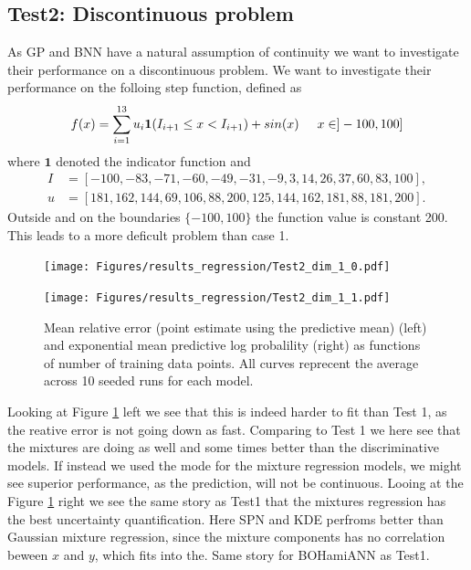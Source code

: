 \subsection*{Test2: Discontinuous problem}
As GP and BNN have a natural assumption of continuity we want to investigate their performance
on a discontinuous problem. We want to investigate their performance on the folloing step function, 
defined as 
$$f(x) = \sum_{i=1}^{13} u_i \bm{1}(I_{i+1}\leq x< I_{i+1}) + sin(x) \hspace{0.5cm} x \in ]-100,100]$$
where $\bm{1}$ denoted the indicator function and
\begin{align*}
  I &= [-100,  -83,  -71,  -60,  -49,  -31,   -9,    3,   14,26,   37,   60,   83,  100],\\
  u &= [181, 162, 144,  69, 106,  88, 200, 125, 144, 162, 181,88, 181, 200].
\end{align*}
Outside and on the boundaries $\{-100,100\}$ the function value is constant 200. This leads
to a more deficult problem than case 1. 
\begin{figure}[H]
  \centering
  \begin{minipage}[b]{0.49\textwidth}
   \texttt{[image: Figures/results\_regression/Test2\_dim\_1\_0.pdf]}
  \end{minipage}
  \hfill
  \begin{minipage}[b]{0.49\textwidth}
    \texttt{[image: Figures/results\_regression/Test2\_dim\_1\_1.pdf]}
   \end{minipage}
  \caption{Mean relative error (point estimate using the predictive mean) (left) and exponential mean predictive log probalility (right) as
  functions of number of training data points. All curves reprecent the average across 10 seeded runs for each
  model.}
  \label{Test2_reg_plot}
\end{figure}
Looking at Figure \ref{Test2_reg_plot} left we see that this is indeed harder to fit than Test 1, as
the reative error is not going down as fast. Comparing to Test 1 we here see that the mixtures are
doing as well and some times better than the discriminative models. If instead we used the mode for
the mixture regression models, we might see superior performance, as the prediction, will not be
continuous. Looing at the Figure \ref{Test2_reg_plot} right we see the same story as Test1 that the
mixtures regression has the best uncertainty quantification. Here SPN and KDE perfroms better than
Gaussian mixture regression, since the mixture components has no correlation beween $x$ and $y$,
which fits into the. Same story for BOHamiANN as Test1.

